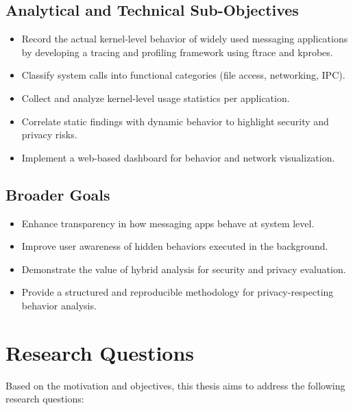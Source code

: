 \documentclass[a4paper,12pt]{report}
\begin{document}
\subsection*{Analytical and Technical Sub-Objectives}
\begin{itemize}
\item Record the actual kernel-level behavior of widely used messaging applications by developing a tracing and profiling framework using ftrace and kprobes.
\item Classify system calls into functional categories (file access, networking, IPC).
\item Collect and analyze kernel-level usage statistics per application.
\item Correlate static findings with dynamic behavior to highlight security and privacy risks.
\item Implement a web-based dashboard for behavior and network visualization.
\end{itemize}

\subsection*{Broader Goals}
\begin{itemize}
\item Enhance transparency in how messaging apps behave at system level.
\item Improve user awareness of hidden behaviors executed in the background.
\item Demonstrate the value of hybrid analysis for security and privacy evaluation.
\item Provide a structured and reproducible methodology for privacy-respecting
behavior analysis.
\end{itemize}

\section{Research Questions}
Based on the motivation and objectives, this thesis aims to address the following
research questions:

\vspace{0.5em}
\noindent{}

\vspace{0.5em}
\noindent{}
\end{document}
